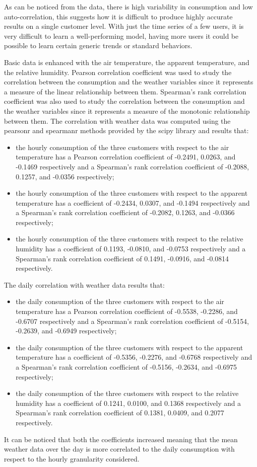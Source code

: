 As can be noticed from the data, there is high variability in consumption and low auto-correlation, this suggests how it is difficult to produce highly accurate results on a single customer level.
With just the time series of a few users, it is very difficult to learn a well-performing model, having more users it could be possible to learn certain generic trends or standard behaviors.

Basic data is enhanced with the air temperature, the apparent temperature, and the relative humidity.
Pearson correlation coefficient was used to study the correlation between the consumption and the weather variables since it represents a measure of the linear relationship between them.
Spearman's rank correlation coefficient was also used to study the correlation between the consumption and the weather variables since it represents a measure of the monotonic relationship between them.
The correlation with weather data was computed using the pearsonr and spearmanr methods provided by the scipy library and results that:
\begin{itemize}
  \item the hourly consumption of the three customers with respect to the air temperature has a Pearson correlation coefficient of -0.2491, 0.0263, and -0.1469 respectively and a Spearman's rank correlation coefficient of -0.2088, 0.1257, and -0.0356 respectively;
  \item the hourly consumption of the three customers with respect to the apparent temperature has a coefficient of -0.2434, 0.0307, and -0.1494 respectively and a Spearman's rank correlation coefficient of -0.2082, 0.1263, and -0.0366 respectively;
  \item the hourly consumption of the three customers with respect to the relative humidity has a coefficient of 0.1193, -0.0810, and -0.0753 respectively and a Spearman's rank correlation coefficient of 0.1491, -0.0916, and -0.0814 respectively.
\end{itemize}

The daily correlation with weather data results that:
\begin{itemize}
  \item the daily consumption of the three customers with respect to the air temperature has a Pearson correlation coefficient of -0.5538, -0.2286, and -0.6707 respectively and a Spearman's rank correlation coefficient of -0.5154, -0.2639, and -0.6949 respectively;
  \item the daily consumption of the three customers with respect to the apparent temperature has a coefficient of -0.5356, -0.2276, and -0.6768 respectively and a Spearman's rank correlation coefficient of -0.5156, -0.2634, and -0.6975 respectively;
  \item the daily consumption of the three customers with respect to the relative humidity has a coefficient of 0.1241, 0.0100, and 0.1368 respectively and a Spearman's rank correlation coefficient of 0.1381, 0.0409, and 0.2077 respectively.
\end{itemize}
It can be noticed that both the coefficients increased meaning that the mean weather data over the day is more correlated to the daily consumption with respect to the hourly granularity considered.

